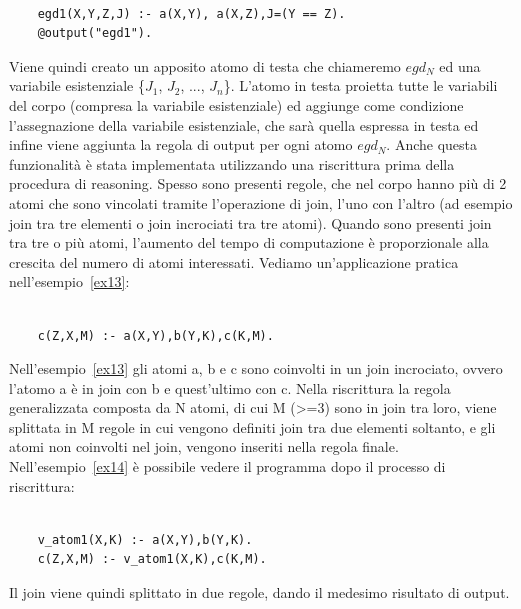 \begin{example}\label{ex18}
	\normalfont
	\begin{lstlisting}
	
	egd1(X,Y,Z,J) :- a(X,Y), a(X,Z),J=(Y == Z).
	@output("egd1").
	\end{lstlisting}
\end{example}
Viene quindi creato un apposito atomo di testa che chiameremo \emph{$egd_{N}$} ed una variabile esistenziale \{$J_{1}$, $J_{2}$, ..., $J_{n}$\}. L'atomo in testa proietta tutte le variabili del corpo (compresa la variabile esistenziale) ed aggiunge come condizione l'assegnazione della variabile esistenziale, che sarà quella espressa in testa ed infine viene aggiunta la regola di output per ogni atomo $egd_{N}$. Anche questa funzionalità è stata implementata utilizzando una riscrittura prima della procedura di reasoning. \newline \newline
Spesso sono presenti regole, che nel corpo hanno più di 2 atomi che sono vincolati tramite l'operazione di join, l'uno con l'altro (ad esempio join tra tre elementi o join incrociati tra tre atomi). \newline
Quando sono presenti join tra tre o più atomi, l'aumento del tempo di computazione è proporzionale alla crescita del numero di atomi interessati. Vediamo un'applicazione pratica nell'esempio~\ref{ex13}:
\begin{example}\label{ex13}
	\normalfont
	\begin{lstlisting}
	
	c(Z,X,M) :- a(X,Y),b(Y,K),c(K,M).
	\end{lstlisting}
\end{example}
Nell'esempio~\ref{ex13} gli atomi a, b e c sono coinvolti in un join incrociato, ovvero l'atomo a è in join con b e quest'ultimo con c. \newline
Nella riscrittura la regola generalizzata composta da N atomi, di cui M (>=3) sono in join tra loro, viene splittata in M regole in cui vengono definiti join tra due elementi soltanto, e gli atomi non coinvolti nel join, vengono inseriti nella regola finale. \newline
Nell'esempio~\ref{ex14} è possibile vedere il programma dopo il processo di riscrittura: 
\begin{example}\label{ex14}
	\normalfont
	\begin{lstlisting}
	
	v_atom1(X,K) :- a(X,Y),b(Y,K). 
	c(Z,X,M) :- v_atom1(X,K),c(K,M).
	\end{lstlisting}
\end{example}
Il join viene quindi splittato in due regole, dando il medesimo risultato di output.

